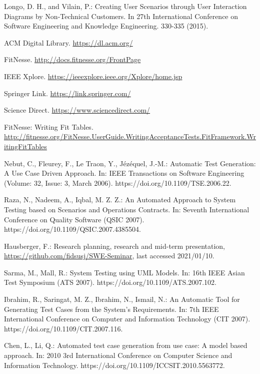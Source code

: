 \documentclass[a4paper,10pt, bibliography=totocnumbered]{scrreprt}
\begin{document}
\begin{thebibliography}{9}
 Longo, D. H., and Vilain, P.: Creating User Scenarios
through User Interaction Diagrams by Non-Technical
Customers. In 27th International Conference on Software
Engineering and Knowledge Engineering. 330-335 (2015).

 ACM Digital Library. \url{https://dl.acm.org/} 

 FitNesse. \url{http://docs.fitnesse.org/FrontPage}

 IEEE Xplore. \url{https://ieeexplore.ieee.org/Xplore/home.jsp}

 Springer Link. \url{https://link.springer.com/}

 Science Direct. \url{https://www.sciencedirect.com/}

 FitNesse: Writing Fit Tables. \url{http://fitnesse.org/FitNesse.UserGuide.WritingAcceptanceTests.FitFramework.WritingFitTables}


 Nebut, C., Fleurey, F., Le Traon, Y., Jézéquel, J.-M.: Automatic Test Generation: A Use Case Driven Approach.
In: IEEE Transactions on Software Engineering (Volume: 32, Issue: 3, March 2006).
https://doi.org/10.1109/TSE.2006.22.

 Raza, N., Nadeem, A., Iqbal, M. Z. Z.: An Automated Approach to System Testing based on Scenarios and Operations Contracts.
In: Seventh International Conference on Quality Software (QSIC 2007).
https://doi.org/10.1109/QSIC.2007.4385504.

 Hausberger, F.: Research planning, research and mid-term presentation, \url{https://github.com/fidsusj/SWE-Seminar}, last accessed 2021/01/10.

 Sarma, M., Mall, R.: System Testing using UML Models.
In: 16th IEEE Asian Test Symposium (ATS 2007).
https://doi.org/10.1109/ATS.2007.102.

 Ibrahim, R., Saringat, M. Z., Ibrahim, N., Ismail, N.: An Automatic Tool for Generating Test Cases from the System's Requirements.
In: 7th IEEE International Conference on Computer and Information Technology (CIT 2007).
https://doi.org/10.1109/CIT.2007.116.

 Chen, L., Li, Q.: Automated test case generation from use case: A model based approach.
In: 2010 3rd International Conference on Computer Science and Information Technology.
https://doi.org/10.1109/ICCSIT.2010.5563772.


\end{thebibliography}
\end{document}

